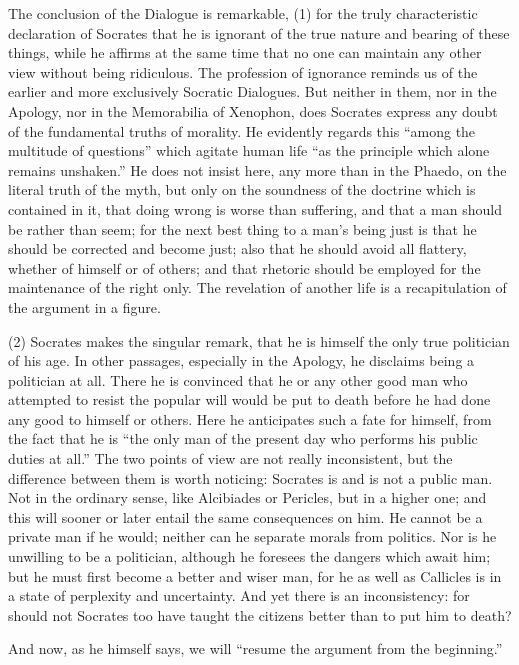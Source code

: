 \documentclass[11pt,letter]{article}
\begin{document}
\par  The conclusion of the Dialogue is remarkable, (1) for the truly characteristic declaration of Socrates that he is ignorant of the true nature and bearing of these things, while he affirms at the same time that no one can maintain any other view without being ridiculous. The profession of ignorance reminds us of the earlier and more exclusively Socratic Dialogues. But neither in them, nor in the Apology, nor in the Memorabilia of Xenophon, does Socrates express any doubt of the fundamental truths of morality. He evidently regards this “among the multitude of questions” which agitate human life “as the principle which alone remains unshaken.” He does not insist here, any more than in the Phaedo, on the literal truth of the myth, but only on the soundness of the doctrine which is contained in it, that doing wrong is worse than suffering, and that a man should be rather than seem; for the next best thing to a man’s being just is that he should be corrected and become just; also that he should avoid all flattery, whether of himself or of others; and that rhetoric should be employed for the maintenance of the right only. The revelation of another life is a recapitulation of the argument in a figure.

\par  (2) Socrates makes the singular remark, that he is himself the only true politician of his age. In other passages, especially in the Apology, he disclaims being a politician at all. There he is convinced that he or any other good man who attempted to resist the popular will would be put to death before he had done any good to himself or others. Here he anticipates such a fate for himself, from the fact that he is “the only man of the present day who performs his public duties at all.” The two points of view are not really inconsistent, but the difference between them is worth noticing: Socrates is and is not a public man. Not in the ordinary sense, like Alcibiades or Pericles, but in a higher one; and this will sooner or later entail the same consequences on him. He cannot be a private man if he would; neither can he separate morals from politics. Nor is he unwilling to be a politician, although he foresees the dangers which await him; but he must first become a better and wiser man, for he as well as Callicles is in a state of perplexity and uncertainty. And yet there is an inconsistency: for should not Socrates too have taught the citizens better than to put him to death?

\par  And now, as he himself says, we will “resume the argument from the beginning.”
\end{document}
